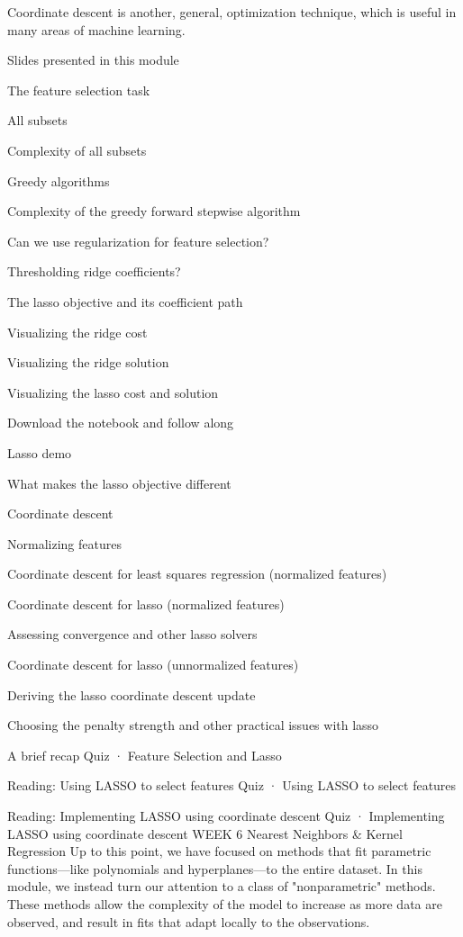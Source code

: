 Coordinate descent is another, general, optimization technique, which is useful in many areas of machine learning.

\item Slides presented in this module
\item The feature selection task
\item All subsets
\item Complexity of all subsets
\item Greedy algorithms
\item Complexity of the greedy forward stepwise algorithm
\item Can we use regularization for feature selection?
\item Thresholding ridge coefficients?
\item The lasso objective and its coefficient path
\item Visualizing the ridge cost
\item Visualizing the ridge solution
\item Visualizing the lasso cost and solution
\item Download the notebook and follow along
\item Lasso demo
\item What makes the lasso objective different
\item Coordinate descent
\item Normalizing features
\item Coordinate descent for least squares regression (normalized features)
\item Coordinate descent for lasso (normalized features)
\item Assessing convergence and other lasso solvers
\item Coordinate descent for lasso (unnormalized features)
\item Deriving the lasso coordinate descent update
\item Choosing the penalty strength and other practical issues with lasso
\item A brief recap
Quiz · Feature Selection and Lasso
\item Reading: Using LASSO to select features
Quiz · Using LASSO to select features
\item Reading: Implementing LASSO using coordinate descent
Quiz · Implementing LASSO using coordinate descent
WEEK 6
Nearest Neighbors & Kernel Regression
Up to this point, we have focused on methods that fit parametric functions---like polynomials and hyperplanes---to the entire dataset. In this module, we instead turn our attention to a class of "nonparametric" methods. These methods allow the complexity of the model to increase as more data are observed, and result in fits that adapt locally to the observations.
